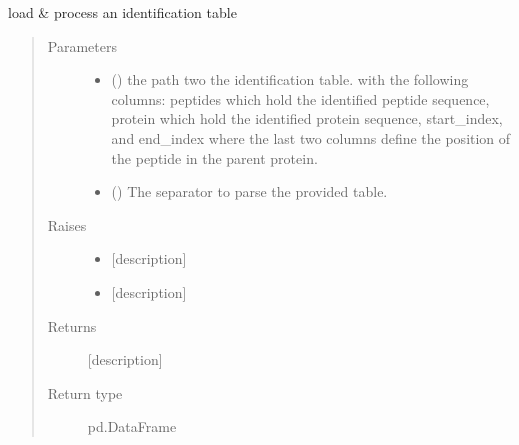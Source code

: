 \documentclass[letterpaper,10pt,english]{sphinxmanual}
\begin{document}

\begin{fulllineitems}
\label{\detokenize{IPTK.IO:IPTK.IO.InFunctions.load_identification_table}}
load \& process an identification table
\begin{quote}\begin{description}
\item[{Parameters}] \leavevmode\begin{itemize}
\item {} 
 () \textendash{} the path two the identification table. with the following columns: peptides which hold the identified
peptide sequence, protein which hold the identified protein sequence, start\_index, and end\_index where
the last two columns define the position of the peptide in the parent protein.

\item {} 
 () \textendash{} The separator to parse the provided table.

\end{itemize}

\item[{Raises}] \leavevmode\begin{itemize}
\item {} 
 \textendash{} {[}description{]}

\item {} 
 \textendash{} {[}description{]}

\end{itemize}

\item[{Returns}] \leavevmode
{[}description{]}

\item[{Return type}] \leavevmode
pd.DataFrame

\end{description}\end{quote}

\end{fulllineitems}
\end{document}
